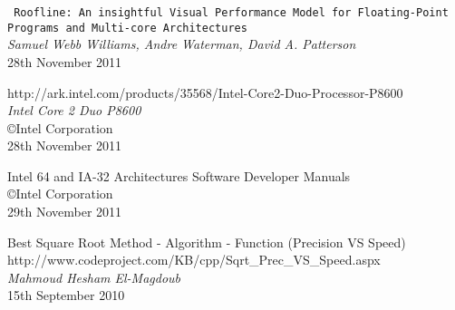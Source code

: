 \documentclass[twocolumn,10pt]{scrartcl}
\begin{document}
\begin{thebibliography}{9}
	\texttt{\small
	Roofline: An insightful Visual Performance Model for Floating-Point Programs and Multi-core Architectures}	\\
	\emph{Samuel Webb Williams, Andre Waterman, David A. Patterson}	\\
	28th November 2011

	\small{http://ark.intel.com/products/35568/Intel-Core2-Duo-Processor-P8600}	\\
	\emph{Intel{\textregistered} Core 2 Duo{\texttrademark} P8600}	\\
	{\copyright}Intel Corporation	\\
	28th November 2011

	\small{Intel{\textregistered} 64 and IA-32 Architectures Software Developer Manuals}	\\
	{\copyright}Intel Corporation	\\
	29th November 2011

	Best Square Root Method - Algorithm - Function (Precision VS Speed)	\\
	http://www.codeproject.com/KB/cpp/Sqrt\_Prec\_VS\_Speed.aspx	\\
	\emph{Mahmoud Hesham El-Magdoub} \\
	15th September 2010

\end{thebibliography}
\end{document}
